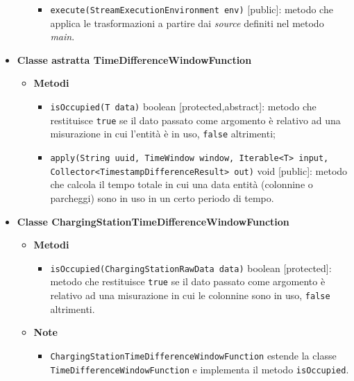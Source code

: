 \begin{itemize}
\begin{itemize}
\begin{itemize}
			            \item \texttt{execute(StreamExecutionEnvironment env)} [public]: metodo che applica le trasformazioni a partire dai \textit{source} definiti nel metodo \textit{main}.
		            \end{itemize}
	      \end{itemize}
	\item \textbf{Classe astratta TimeDifferenceWindowFunction}
	      \begin{itemize}
		      \item \textbf{Metodi}
		            \begin{itemize}
			            \item \texttt{isOccupied(T data)} boolean [protected,abstract]: metodo che restituisce \texttt{true} se il dato passato come argomento è relativo ad una misurazione in cui l'entità è in uso, \texttt{false} altrimenti;
			            \item \texttt{apply(String uuid, TimeWindow window, Iterable<T> input,} \\\texttt{Collector<TimestampDifferenceResult> out)} void [public]: metodo
			                  che calcola il tempo totale in cui una data entità (colonnine o parcheggi) sono in uso in un certo periodo di tempo.
		            \end{itemize}
	      \end{itemize}
	\item \textbf{Classe ChargingStationTimeDifferenceWindowFunction}
	      \begin{itemize}
		      \item \textbf{Metodi}
		            \begin{itemize}
			            \item \texttt{isOccupied(ChargingStationRawData data)} boolean [protected]: metodo che restituisce \texttt{true} se il dato passato come argomento è relativo ad una misurazione in cui le colonnine sono in uso, \texttt{false} altrimenti.
		            \end{itemize}
		      \item \textbf{Note}
		            \begin{itemize}
			            \item \texttt{ChargingStationTimeDifferenceWindowFunction} estende la classe \\\texttt{TimeDifferenceWindowFunction} e implementa il metodo \texttt{isOccupied}.
		            \end{itemize}
	      \end{itemize}

\end{itemize}
